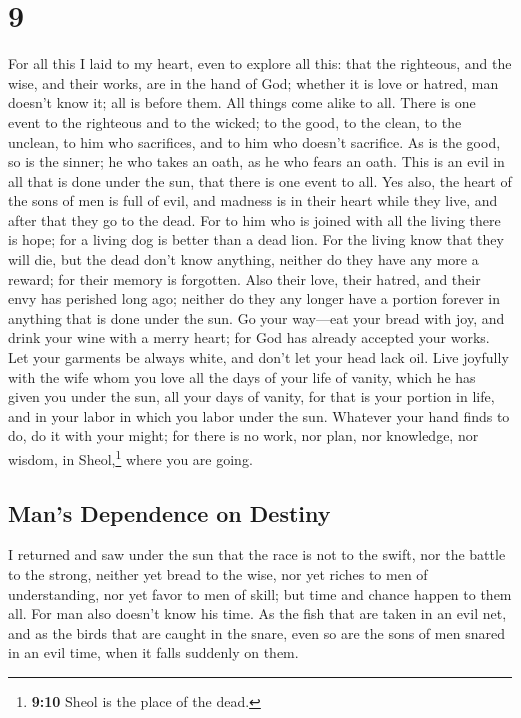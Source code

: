 \hypertarget{section-8}{%
\section{9}\label{section-8}}

 For all this I laid to my heart, even to explore all
this: that the righteous, and the wise, and their works, are in the hand
of God; whether it is love or hatred, man doesn't know it; all is before
them.  All things come alike to all. There is one event to
the righteous and to the wicked; to the good, to the clean, to the
unclean, to him who sacrifices, and to him who doesn't sacrifice. As is
the good, so is the sinner; he who takes an oath, as he who fears an
oath.  This is an evil in all that is done under the sun,
that there is one event to all. Yes also, the heart of the sons of men
is full of evil, and madness is in their heart while they live, and
after that they go to the dead.  For to him who is joined
with all the living there is hope; for a living dog is better than a
dead lion.  For the living know that they will die, but
the dead don't know anything, neither do they have any more a reward;
for their memory is forgotten.  Also their love, their
hatred, and their envy has perished long ago; neither do they any longer
have a portion forever in anything that is done under the sun.
 Go your way---eat your bread with joy, and drink your
wine with a merry heart; for God has already accepted your works.
 Let your garments be always white, and don't let your
head lack oil.  Live joyfully with the wife whom you love
all the days of your life of vanity, which he has given you under the
sun, all your days of vanity, for that is your portion in life, and in
your labor in which you labor under the sun.  Whatever
your hand finds to do, do it with your might; for there is no work, nor
plan, nor knowledge, nor wisdom, in Sheol,\footnote{\textbf{9:10} Sheol
  is the place of the dead.} where you are going.

\hypertarget{mans-dependence-on-destiny}{%
\subsection{Man's Dependence on
Destiny}\label{mans-dependence-on-destiny}}

 I returned and saw under the sun that the race is not to
the swift, nor the battle to the strong, neither yet bread to the wise,
nor yet riches to men of understanding, nor yet favor to men of skill;
but time and chance happen to them all.  For man also
doesn't know his time. As the fish that are taken in an evil net, and as
the birds that are caught in the snare, even so are the sons of men
snared in an evil time, when it falls suddenly on them.

